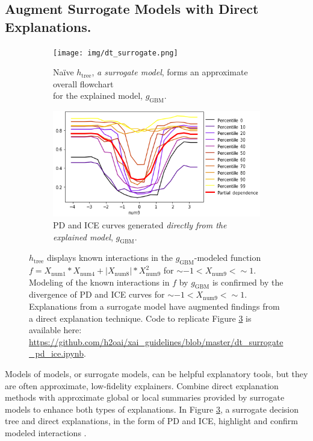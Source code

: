 \documentclass[sigconf]{acmart}
\begin{document}
\subsection{Augment Surrogate Models with Direct Explanations.} \label{sec:surrogate}

\begin{figure}[htb!]
	\begin{subfigure}{.55\textwidth}	\centering
		\texttt{[image: img/dt\_surrogate.png]}
  		\caption{Na\"ive $h_{\text{tree}}$, \textit{a surrogate model}, forms an approximate overall flowchart\\ for the explained model, $g_{\text{GBM}}$.}
  		\label{fig:dt_surrogate}
	\end{subfigure}\hfill
	\begin{subfigure}{.45\textwidth}	\centering
  		\includegraphics[height=0.4\linewidth, width=0.75\linewidth]{img/pdp_ice.png}
  		\caption{PD and ICE curves generated \textit{directly from the explained model}, $g_{\text{GBM}}$.}
  		\label{fig:pdp_ice}
	\end{subfigure} \vspace{-5pt}
	\caption{$h_{\text{tree}}$ displays known interactions in the $g_{\text{GBM}}$-modeled function $f = X_{\text{num}1} * X_{\text{num}4} + |X_{\text{num}8}| * X_{\text{num}9}^2$ for $\sim -1 < X_{\text{num9}} <  \sim 1$. Modeling of the known interactions in $f$ by $g_{\text{GBM}}$ is confirmed by the divergence of PD and ICE curves for $\sim -1 < X_{\text{num9}} <  \sim 1$. Explanations from a surrogate model have augmented findings from a direct explanation technique. Code to replicate Figure \ref{fig:pdp_ice_dt_surrogate} is available here: \url{https://github.com/h2oai/xai_guidelines/blob/master/dt_surrogate_pd_ice.ipynb}.}
	\label{fig:pdp_ice_dt_surrogate}
\end{figure}

Models of models, or surrogate models, can be helpful explanatory tools, but they are often approximate, low-fidelity explainers. Combine direct explanation methods with approximate global or local summaries provided by surrogate models to enhance both types of explanations. In Figure \ref{fig:pdp_ice_dt_surrogate}, a surrogate decision tree and direct explanations, in the form of PD and ICE, highlight and confirm modeled interactions \cite{art_and_sci}.
\end{document}
